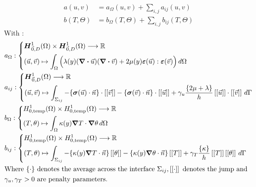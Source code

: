 \documentclass[a4paper,12pt,twoside]{report}
\newcommand{\mtr}{\mathbb{R}}
\begin{document}
\begin{align*}
a(u,v) &= a_\Omega(u,v) + \sum_{i,j} a_{ij}(u,v) \\
b(T,\Theta) &= b_\Omega(T,\Theta) + \sum_{i,j} b_{ij}(T,\Theta)
\end{align*}
With : 
\begin{equation*}
	\begin{aligned}
	& a_\Omega : \left\{
		\begin{aligned}
			& \boldsymbol{H}^1_{\vec 0,D}(\Omega) \times \boldsymbol{H}^1_{\vec 0,D}(\Omega) \longrightarrow \mtr \\
			& (\vec u, \vec v) \mapsto \int_{\Omega} \Big( \lambda(y) (\div \vec u) (\div \vec v) + 2\mu(y) \boldsymbol{\varepsilon}(\vec u) : \boldsymbol{\varepsilon}(\vec v) \Big) \, d\Omega 
		\end{aligned}
	\right. \\
	& a_{ij} : \left\{
		\begin{aligned}
			& \boldsymbol{H}^1_{\vec 0,D}(\Omega) \longrightarrow \mtr \\ 
			& (\vec u, \vec v) \mapsto \int_{\Sigma_{ij}} - \{\boldsymbol{\sigma}(\vec u) \cdot \vec n\} \cdot \left[\left[ \vec v \right]\right] - \{\boldsymbol{\sigma}(\vec v) \cdot \vec n\} \cdot \left[\left[ \vec u \right]\right] + \gamma_u \frac{\{2 \mu + \lambda\}}{h} \left[\left[ \vec u \right]\right] \cdot \left[\left[ \vec v \right]\right] \, d\Gamma
		\end{aligned}
	\right.\\
	& b_\Omega : \left\{
		\begin{aligned}
			& H^1_{0,\text{temp}}(\Omega) \times H^1_{0,\text{temp}}(\Omega) \longrightarrow \mtr \\
			& (T, \theta) \mapsto \int_{\Omega} \kappa(y) \grad T \cdot \grad \theta \, d\Omega 
		\end{aligned}
	\right. \\
	& b_{ij} : \left\{
		\begin{aligned}
			& H^1_{0,\text{temp}}(\Omega) \times H^1_{0,\text{temp}}(\Omega) \longrightarrow \mtr \\
			& (T, \theta) \mapsto \int_{\Sigma_{ij}} - \{ \kappa(y) \grad T \cdot \vec n \} \left[\left[ \theta \right]\right] - \{ \kappa(y) \grad \theta \cdot \vec n \}  \left[\left[ T \right]\right] + \gamma_T \frac{\{ \kappa \}}{h} \left[\left[ T \right]\right]\left[\left[ \theta \right]\right] \, d\Gamma
		\end{aligned}
	\right. \\
	& \text{Where } \{ \cdot \} \text{ denotes the average across the interface } \Sigma_{ij}, \left[\left[\cdot\right]\right] \text{ denotes the jump and } \\
	& \gamma_u, \gamma_T > 0 \text{ are penalty parameters.} 
	\end{aligned}
\end{equation*}
\end{document}
